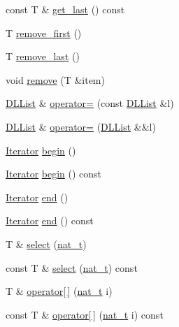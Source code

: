\begin{DoxyCompactItemize}
\item 
const T \& \hyperlink{class_designar_1_1_d_l_list_aae2cd78c744f82ece725c9d21a02d4da}{get\+\_\+last} () const
\item 
T \hyperlink{class_designar_1_1_d_l_list_a62e4c39df6ba191e7cd8dadac70109fb}{remove\+\_\+first} ()
\item 
T \hyperlink{class_designar_1_1_d_l_list_ac64bdba91bd7ff758fbb0e29f50dadcd}{remove\+\_\+last} ()
\item 
void \hyperlink{class_designar_1_1_d_l_list_a6fd7f99c303dc6897a72dabd5f1f943d}{remove} (T \&item)
\item 
\hyperlink{class_designar_1_1_d_l_list}{D\+L\+List} \& \hyperlink{class_designar_1_1_d_l_list_a3fda59e4bde20b86ee0cc0f083fc5f3a}{operator=} (const \hyperlink{class_designar_1_1_d_l_list}{D\+L\+List} \&l)
\item 
\hyperlink{class_designar_1_1_d_l_list}{D\+L\+List} \& \hyperlink{class_designar_1_1_d_l_list_a4c8c2df2e049fbbbfea113ae43365ff0}{operator=} (\hyperlink{class_designar_1_1_d_l_list}{D\+L\+List} \&\&l)
\item 
\hyperlink{class_designar_1_1_d_l_list_1_1_iterator}{Iterator} \hyperlink{class_designar_1_1_d_l_list_a1c011ca480554788280073fcdf6804c6}{begin} ()
\item 
\hyperlink{class_designar_1_1_d_l_list_1_1_iterator}{Iterator} \hyperlink{class_designar_1_1_d_l_list_a5fa0fa23f4ab881a04be6786de312dad}{begin} () const
\item 
\hyperlink{class_designar_1_1_d_l_list_1_1_iterator}{Iterator} \hyperlink{class_designar_1_1_d_l_list_afa49470cd57bc800bfa95c00cebb4c08}{end} ()
\item 
\hyperlink{class_designar_1_1_d_l_list_1_1_iterator}{Iterator} \hyperlink{class_designar_1_1_d_l_list_a44bec24be9eb3b3bbfeadc28240a1650}{end} () const
\item 
T \& \hyperlink{class_designar_1_1_d_l_list_abb57692be6aa79d00b65e40cd8402621}{select} (\hyperlink{namespace_designar_aa72662848b9f4815e7bf31a7cf3e33d1}{nat\+\_\+t})
\item 
const T \& \hyperlink{class_designar_1_1_d_l_list_a7060ef1496f583a3d4ed64b8ffdb94c8}{select} (\hyperlink{namespace_designar_aa72662848b9f4815e7bf31a7cf3e33d1}{nat\+\_\+t}) const
\item 
T \& \hyperlink{class_designar_1_1_d_l_list_aeb63bb4da91b7f1aed9a32de679122df}{operator\mbox{[}$\,$\mbox{]}} (\hyperlink{namespace_designar_aa72662848b9f4815e7bf31a7cf3e33d1}{nat\+\_\+t} i)
\item 
const T \& \hyperlink{class_designar_1_1_d_l_list_a24b5b31952821f0d40fef5326ba635b3}{operator\mbox{[}$\,$\mbox{]}} (\hyperlink{namespace_designar_aa72662848b9f4815e7bf31a7cf3e33d1}{nat\+\_\+t} i) const
\end{DoxyCompactItemize}


